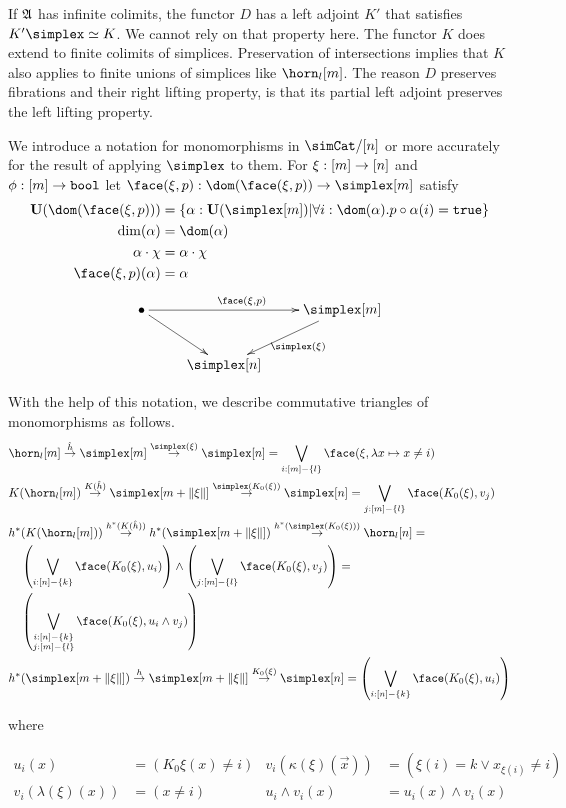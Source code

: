 \documentclass[csh.tex]{subfiles}
\begin{document}
If $\mathfrak A$ has infinite colimits, the functor $D$ has a left adjoint $K'$ that satisfies $K'\simplex\simeq K$. We cannot rely on that property here. The functor $K$ does extend to finite colimits of simplices. Preservation of intersections implies that $K$ also applies to finite unions of simplices like $\horn_l[m]$. The reason $D$ preserves fibrations and their right lifting property, is that its partial left adjoint preserves the left lifting property. 

\begin{definition} We introduce a notation for monomorphisms in $\simCat/[n]$ or more accurately for the result of applying $\simplex$ to them. For $\xi:[m]\to[n]$ and $\phi:[m]\to\mathtt{bool}$ let $\face(\xi,p)\of \dom(\face(\xi,p))\to \simplex[m]$ satisfy
\begin{align*}
\base(\dom(\face(\xi,p))) &= \set{\alpha\of\base(\simplex[m])\middle|\forall i\of \dom(\alpha).p\circ\alpha(i)=\true}\\
\dim(\alpha) &= \dom(\alpha)\\
\alpha\cdot\chi &= \alpha\cdot\chi\\
\face(\xi,p)(\alpha) &= \alpha
\end{align*}
\[\xymatrix{
\bullet\ar[rr]^{\face(\xi,p)}\ar[dr] && \simplex[m]\ar[dl]^{\simplex(\xi)} \\
& \simplex[n]
}\]
\end{definition}

With the help of this notation, we describe commutative triangles of monomorphisms as follows.
\begin{align}
&\horn_l[m]\stackrel{\hat h}\to \simplex[m]\stackrel{\simplex(\xi)}\to \simplex[n] = \bigvee_{i\of [m]-\set l} \face(\xi,\function x{x\neq i})\\
&K(\horn_l[m])\stackrel{K(\hat h)}\to \simplex[m+\norm\xi]\stackrel{\simplex(K_0(\xi))}\to \simplex[n] = \bigvee_{j\of [m]-\set l} \face(K_0(\xi),v_j)\\
&h\ri(K(\horn_l[m]))\stackrel{h\ri(K(\hat h))}\to h\ri(\simplex[m+\norm\xi])\stackrel{h\ri(\simplex(K_0(\xi)))}\to \horn_l[n] = \\
&\quad\left(\bigvee_{i\of[n]-\set k} \face(K_0(\xi),u_i)\right)\wedge\left(\bigvee_{j\of [m]-\set l} \face(K_0(\xi),v_j)\right)=\\
&\quad\left(\bigvee_{\substack{i\of[n]-\set k\\j\of [m]-\set l}}\face(K_0(\xi),u_i\land v_j)\right)\\
&h\ri(\simplex[m+\norm\xi])\stackrel{h}\to \simplex[m+\norm\xi]\stackrel{K_0(\xi)}\to \simplex[n] =\left(\bigvee_{i\of[n]-\set k} \face(K_0(\xi),u_i)\right)
\end{align}
\begin{center}
where
\end{center}
\begin{align*}
u_i(x) &= (K_0\xi(x)\neq i) & 
v_i(\kappa(\xi)(\vec x)) &= (\xi(i)= k\vee x_{\xi(i)}\neq i)\\
v_i(\lambda(\xi)(x)) &= (x\neq i)&
u_i\land v_i(x) &= u_i(x)\land v_i(x)
\end{align*}
\end{document}
